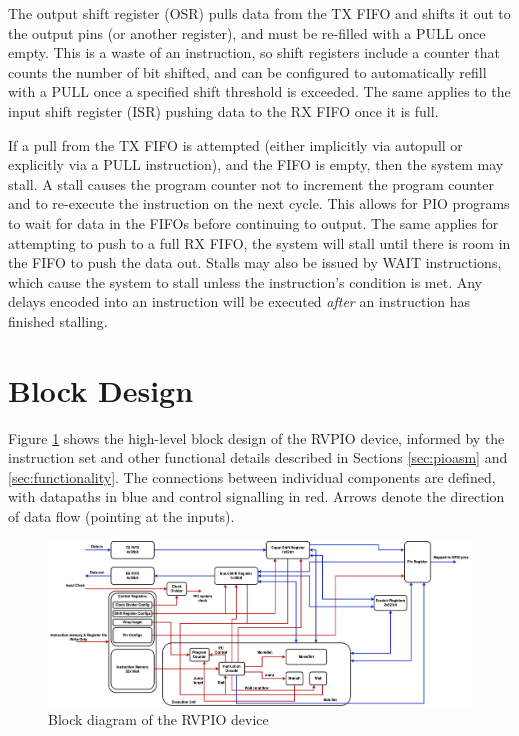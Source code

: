 The output shift register (OSR) pulls data from the TX FIFO and shifts it out to the output pins (or another register), and must be re-filled with a PULL once empty. This is a waste of an instruction, so shift registers include a counter that counts the number of bit shifted, and can be configured to automatically refill with a PULL once a specified shift threshold is exceeded. The same applies to the input shift register (ISR) pushing data to the RX FIFO once it is full.

If a pull from the TX FIFO is attempted (either implicitly via autopull or explicitly via a PULL instruction), and the FIFO is empty, then the system may stall. A stall causes the program counter not to increment the program counter and to re-execute the instruction on the next cycle. This allows for PIO programs to wait for data in the FIFOs before continuing to output. The same applies for attempting to push to a full RX FIFO, the system will stall until there is room in the FIFO to push the data out. Stalls may also be issued by WAIT instructions, which cause the system to stall unless the instruction's condition is met. Any delays encoded into an instruction will be executed \textit{after} an instruction has finished stalling.

\section{Block Design}

Figure \ref{fig:bd} shows the high-level block design of the RVPIO device, informed by the instruction set and other functional details described in Sections \ref{sec:pioasm} and \ref{sec:functionality}. The connections between individual components are defined, with datapaths in blue and control signalling in red. Arrows denote the direction of data flow (pointing at the inputs).

\begin{figure}[H]
    \centering
    \includegraphics[width=1.1\textwidth]{../img/bd.png}
    \caption{Block diagram of the RVPIO device}
    \label{fig:bd}
\end{figure}

